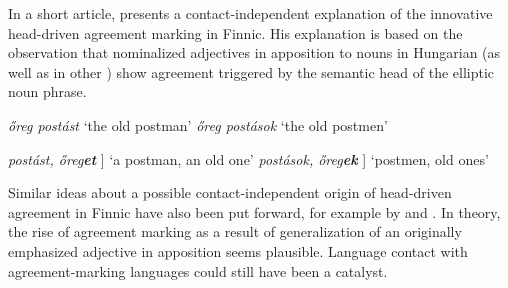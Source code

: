{
In a short article, \citet{mark1979} presents a contact-independent explanation of the innovative head\hyp{}driven agreement marking in Finnic. His explanation is based on the observation that nominalized adjectives in apposition to nouns in Hungarian (as well as in other ) show agreement triggered by the semantic head of the elliptic noun phrase.
\begin{exe}
\label{hung ap}
\begin{xlist}
\begin{xlist}
\ex \textit{őreg postást} 		{ ‘the old postman’}
\ex \textit{őreg postások} 		{ ‘the old postmen’}
\end{xlist}
\begin{xlist}
\ex \textit{postást, őreg\textbf{et}} 	{\upshape [[N\textsubscript{\upshape nom.sg}] [A\textsubscript{nom.sg}]] ‘a postman, an old one’}
\ex \textit{postások, őreg\textbf{ek}} 	{\upshape [[N\textsubscript{nom.sg}] [A\textsubscript{nom.sg}]] ‘postmen, old ones’}
\end{xlist}
\end{xlist}
\end{exe}

Similar ideas about a possible contact-independent origin of head\hyp{}driven agreement in Finnic have also been put forward, for example by \citet{ravila1941} and \citet{papp1962}. In theory, the rise of agreement marking as a result of generalization of an originally emphasized adjective in apposition seems plausible. Language contact with agreement-marking languages could still have been a catalyst. 

}
